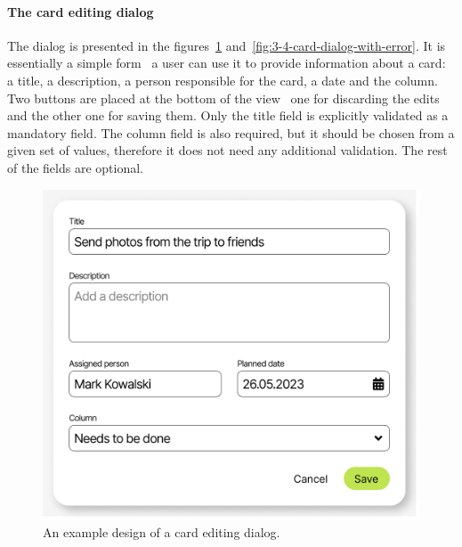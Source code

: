 \paragraph{The card editing dialog}
The dialog is presented in the figures~\ref{fig:3-4-card-dialog} and~\ref{fig:3-4-card-dialog-with-error}.
It is essentially a simple form \textendash\ a user can use it to provide information about a card: a title, a description, a person responsible for the card, a date and the column.
Two buttons are placed at the bottom of the view \textendash\ one for discarding the edits and the other one for saving them.
Only the title field is explicitly validated as a mandatory field.
The column field is also required, but it should be chosen from a given set of values, therefore it does not need any additional validation.
The rest of the fields are optional.

\begin{figure}
    \centering
    \includegraphics[height=0.4\textheight]{./3-research-methodology/card-dialog}
    \caption{An example design of a card editing dialog.}
    \label{fig:3-4-card-dialog}
\end{figure}

